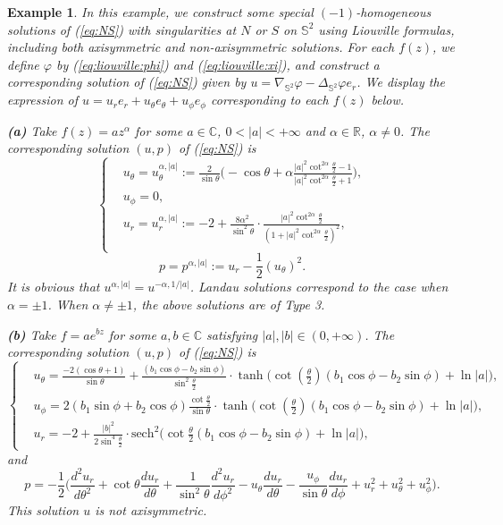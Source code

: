 \documentclass[12pt]{article}
\newtheorem{example}{Example}[section]
\newcommand{\bS}{\mathbb{S}}
\begin{document}
\begin{example}
	In this example, we construct some special $(-1)$-homogeneous solutions of (\ref{eq:NS}) with singularities at $N$ or $S$ on $\bS^2$ using Liouville formulas, including both axisymmetric and non-axisymmetric solutions. For each $f(z)$, we define $\varphi$ by (\ref{eq:liouville:phi}) and (\ref{eq:liouville:xi}), and construct a corresponding solution of (\ref{eq:NS}) given by $u=\nabla_{\bS^2} \varphi-\Delta_{\bS^2} \varphi e_r$. We display the expression of $u=u_re_r+u_{\theta}e_{\theta}+u_{\phi}e_{\phi}$ corresponding to each $f(z)$ below. 

	\noindent\textbf{\em (a)}
	Take $f(z)=az^{\alpha}$ for some $a\in\mathbb{C}$, $0<|a|<+\infty$ and $\alpha\in\mathbb{R}$, $\alpha\ne 0$. The corresponding solution $(u, p)$ of (\ref{eq:NS}) is 
	\begin{equation}\label{eq:liouville:u}
	\left\{
	\begin{aligned}
		& u_{\theta}=u_{\theta}^{\alpha,|a|} := \frac{2}{\sin\theta} \Big( - \cos\theta + \alpha \frac{ |a|^2\cot^{2\alpha}\frac{\theta}{2} -1 }{ |a|^2\cot^{2\alpha}\frac{\theta}{2}+1} \Big), \\
		& u_{\phi}=0,\\
		& u_r=u_r^{\alpha,|a|} := - 2 + \frac{8\alpha^2}{\sin^2\theta} \cdot \frac{|a|^2 \cot^{2\alpha}\frac{\theta}{2}}{ (1 + |a|^2\cot^{2\alpha}\frac{\theta}{2})^2},\\
	\end{aligned}
	\right.
	\end{equation}
	\begin{equation}
		p=p^{\alpha,|a|}:= u_r - \frac{1}{2} (u_{\theta})^2.
	\end{equation}
	It is obvious that $u^{\alpha,|a|} = u^{-\alpha,1/|a|}$. Landau solutions correspond to the case when $\alpha=\pm 1$. When $\alpha\ne \pm 1$, the above solutions are of Type 3. 
	
	\noindent\textbf{\em (b)} Take $f = a e^{bz}$ for some $a,b\in\mathbb{C}$ satisfying $|a|,|b|\in (0,+\infty)$. The corresponding solution $(u, p)$ of (\ref{eq:NS}) is 
	\[
	\left\{
	\begin{aligned}
		& u_{\theta} = \frac{-2(\cos\theta+1)}{\sin\theta} + \frac{ (b_1 \cos\phi - b_2 \sin\phi) }{ \sin^2\frac{\theta}{2} } \cdot \tanh \Big( \cot(\frac{\theta}{2}) (b_1\cos\phi - b_2\sin\phi) + \ln |a| \Big), \\
		& u_{\phi} = 2 (b_1\sin\phi+b_2\cos\phi)\frac{\cot\frac{\theta}{2}}{\sin\theta} \cdot \tanh \Big( \cot(\frac{\theta}{2}) (b_1\cos\phi - b_2\sin\phi) + \ln |a| \Big), \\
		& u_r = -2 + \frac{|b|^2 }{ 2 \sin^4\frac{\theta}{2} } \cdot \text{sech}^2 \Big( \cot\frac{\theta}{2}(b_1\cos\phi - b_2 \sin\phi) + \ln |a| \Big), 
	\end{aligned}
	\right.
	\]
	and 
	\begin{equation}\label{eq:liouville:p}
		p = -\frac{1}{2} \Big( \frac{d^2 u_r}{d\theta^2} + \cot\theta \frac{d u_r}{d\theta} + \frac{1}{\sin^2\theta} \frac{d^2 u_r}{d\phi^2} - u_\theta \frac{d u_r}{d\theta} - \frac{u_\phi}{\sin\theta} \frac{d u_r}{d\phi} + u_r^2 + u_\theta^2 + u_\phi^2 \Big). 
	\end{equation}
	This solution $u$ is not axisymmetric. 	


\end{example}
\end{document}
